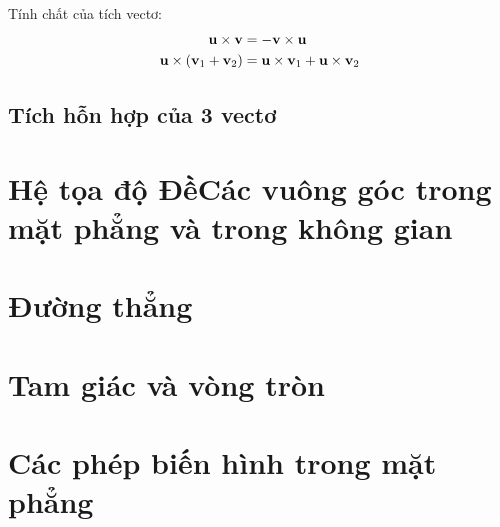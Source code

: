         Tính chất của tích vectơ:
        \begin{align}
            \boldsymbol{\mathbf{u}} \times \boldsymbol{\mathbf{v}}                  &= -\boldsymbol{\mathbf{v}} \times \boldsymbol{\mathbf{u}} \\
            \boldsymbol{\mathbf{u}} \times (\boldsymbol{\mathbf{v}}_1 + \boldsymbol{\mathbf{v}}_2)  &= \boldsymbol{\mathbf{u}} \times \boldsymbol{\mathbf{v}}_1 + \boldsymbol{\mathbf{u}} \times \boldsymbol{\mathbf{v}}_2
        \end{align}

    \subsection{Tích hỗn hợp của 3 vectơ}

\section{Hệ tọa độ ĐềCác vuông góc  trong mặt phẳng và trong không gian}
\section{Đường thẳng}
\section{Tam giác và vòng tròn}
\section{Các phép biến  hình trong mặt phẳng}
